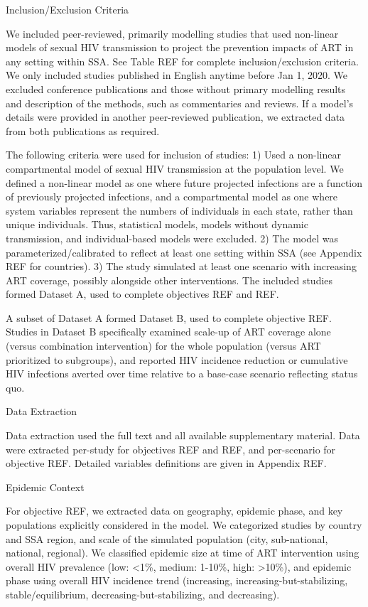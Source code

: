 Inclusion/Exclusion Criteria

We included peer-reviewed, primarily modelling studies that used non-linear models of sexual HIV transmission
to project the prevention impacts of ART in any setting within SSA.
See Table REF for complete inclusion/exclusion criteria.
We only included studies published in English anytime before Jan 1, 2020.
We excluded conference publications and those without primary modelling results and description of the methods,
such as commentaries and reviews.
If a model's details were provided in another peer-reviewed publication,
we extracted data from both publications as required.

The following criteria were used for inclusion of studies:
1) Used a non-linear compartmental model of sexual HIV transmission at the population level.
We defined a non-linear model as one where
future projected infections are a function of previously projected infections,
and a compartmental model as one where
system variables represent the numbers of individuals in each state,
rather than unique individuals.
Thus, statistical models, models without dynamic transmission, and individual-based models were excluded.
2) The model was parameterized/calibrated to reflect at least one setting within SSA
(see Appendix REF for countries).
3) The study simulated at least one scenario with increasing ART coverage,
possibly alongside other interventions.
The included studies formed Dataset A,
used to complete objectives REF and REF.

A subset of Dataset A formed Dataset B,
used to complete objective REF.
Studies in Dataset B specifically examined
scale-up of ART coverage alone (versus combination intervention)
for the whole population (versus ART prioritized to subgroups),
and reported HIV incidence reduction or cumulative HIV infections averted over time 
relative to a base-case scenario reflecting status quo.

Data Extraction

Data extraction used the full text and all available supplementary material.
Data were extracted per-study for objectives REF and REF, and
per-scenario for objective REF.
Detailed variables definitions are given in Appendix REF.

Epidemic Context

For objective REF, we extracted data on
geography, epidemic phase, and key populations explicitly considered in the model.
We categorized studies by country and SSA region, and
scale of the simulated population (city, sub-national, national, regional).
We classified epidemic size at time of ART intervention using
overall HIV prevalence (low: <1\%, medium: 1-10\%, high: >10\%),
and epidemic phase using overall HIV incidence trend
(increasing, increasing-but-stabilizing, stable/equilibrium, decreasing-but-stabilizing, and decreasing).

